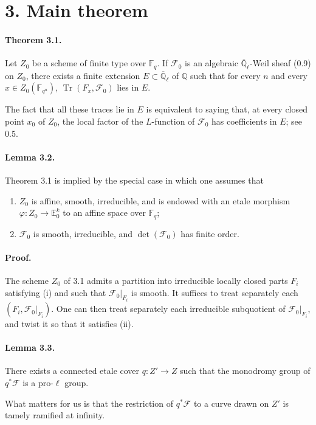 \documentclass[10pt]{article}
\newcommand{\F}{\mathbb{F}}
\newcommand{\Q}{\mathbb{Q}}
\newcommand{\Ql}{\overline{\mathbb Q}_{\ell}}
\newcommand{\Tr}{\operatorname{Tr}}
\begin{document}
\section*{3. Main theorem}

\paragraph{Theorem 3.1.}
Let $Z_0$ be a scheme of finite type over $\F_q$.
If $\mathcal F_0$ is an algebraic $\Ql$-Weil sheaf (0.9) on $Z_0$, there exists a finite extension $E\subset\Ql$ of $\Q$ such that for every $n$ and every $x\in Z_0(\F_{q^n})$, $\Tr(F_x,\mathcal F_0)$ lies in $E$.

The fact that all these traces lie in $E$ is equivalent to saying that, at every closed point $x_0$ of $Z_0$, the local factor of the $L$-function of $\mathcal F_0$ has coefficients in $E$; see 0.5.

\paragraph{Lemma 3.2.}
Theorem 3.1 is implied by the special case in which one assumes that
\begin{enumerate}[label=(\roman*)]
\item $Z_0$ is affine, smooth, irreducible, and is endowed with an etale morphism $\varphi:Z_0\to\mathbb E^k_0$ to an affine space over $\F_q$;
\item $\mathcal F_0$ is smooth, irreducible, and $\det(\mathcal F_0)$ has finite order.
\end{enumerate}

\paragraph{Proof.}
The scheme $Z_0$ of 3.1 admits a partition into irreducible locally closed parts $F_i$ satisfying (i) and such that $\mathcal F_0|_{F_i}$ is smooth.
It suffices to treat separately each $(F_i,\mathcal F_0|_{F_i})$.
One can then treat separately each irreducible subquotient of $\mathcal F_0|_{F_i}$, and twist it so that it satisfies (ii).

\paragraph{Lemma 3.3.}
There exists a connected etale cover $q:Z'\to Z$ such that the monodromy group of $q^*\mathcal F$ is a pro-$\ell$ group.

What matters for us is that the restriction of $q^*\mathcal F$ to a curve drawn on $Z'$ is tamely ramified at infinity.
\end{document}
